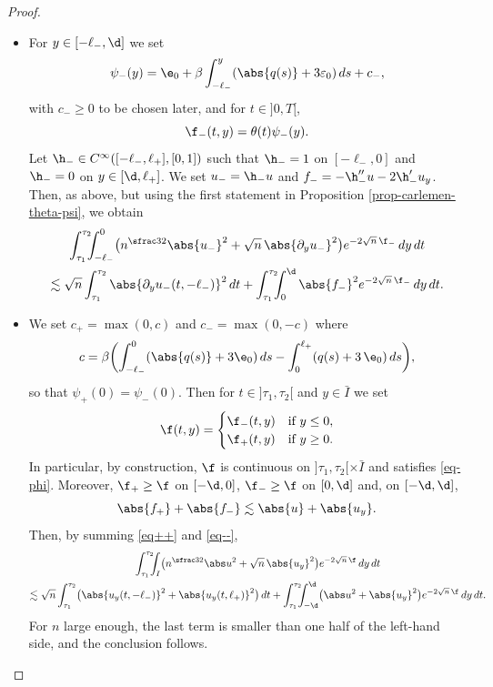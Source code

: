 \begin{proof}
\begin{itemize}
\item
For $y \in [-\ell_-,\d]$ we set
\[
\psi_-(y) = \e_0 + \beta \int_{-\ell_-}^y (\abs{q(s)} + 3 \varepsilon_0)\, ds + c_-,
\]
with $c_- \geq 0$ to be chosen later, and for $t \in{}]0,T[$,
\[
\f_-(t,y) = \theta(t) \psi_-(y).
\]
Let $\h_- \in C^\infty([-\ell_-,\ell_+],[0,1])$ such that $\h_- = 1$ on $[-\ell_-,0]$ and $\h_- = 0$ on $y \in [\d,\ell_+]$. We set $u_- = \h_- u$ and $f_- = -\h_-'' u - 2 \h_-' u_y$. Then, as above, but using the first statement in Proposition \ref{prop-carlemen-theta-psi}, we obtain
\begin{multline} \label{eq--}
\int_{\tau_1}^{\tau_2}\hspace*{-2mm} \int_{-\ell_-}^0 \bigl(n^{\sfrac 32} \abs {u_-}^2 + \sqrt n\,\abs{\partial_y u_-}^2 \bigr) e^{- 2 \sqrt n\,\f_-} \, dy \, dt\\
\lesssim \sqrt n \int_{\tau_1}^{\tau_2} \abs{\partial_y u_-(t,-\ell_-)}^2 \, dt + \int_{\tau_1}^{\tau_2}\hspace*{-2mm} \int_0^\d \abs {f_-}^2 e^{-2\sqrt n\,\f_-} \, dy \, dt.
\end{multline}

\item
We set $c_+ = \max(0,c)$ and $c_- = \max(0,-c)$ where
\[
c = \beta \biggl(\int_{-\ell_-}^0 (\abs{q(s)} + 3\e_0)\, ds - \int_0^{\ell_+}(q(s) + 3\, \e_0)\,ds \biggr),
\]
so that $\psi_+(0) = \psi_-(0)$. Then for $t \in{}]\tau_1,\tau_2[$ and $y \in \bar I$ we set
\[
\f(t,y) =
\begin{cases}
\f_-(t,y) & \text{if } y \leq 0,\\
\f_+(t,y) & \text{if } y \geq 0.
\end{cases}
\]
In particular, by construction, $\f$ is continuous on $]\tau_1,\tau_2[\times \bar I$ and satisfies \eqref{eq-phi}. Moreover, $\f_+ \geq \f$ on $[-\d,0]$, $\f_- \geq \f$ on $[0,\d]$ and, on $[-\d,\d]$,
\[
\abs{f_+} + \abs {f_-} \lesssim \abs {u} + \abs{u_y}.
\]
Then, by summing \eqref{eq++} and \eqref{eq--},
\begin{multline*}
\int_{\tau_1}^{\tau_2}\hspace*{-2mm} \int_{I} \bigl(n^{\sfrac 32} \abs u^2 + \sqrt n\,\abs{u_y}^2 \bigr) e^{-2 \sqrt n\,\f} \, dy \, dt\\
\lesssim \sqrt n \int_{\tau_1}^{\tau_2} \bigl(\abs{u_y(t,-\ell_-)}^2 + \abs{u_y(t,\ell_+)}^2 \bigr) \, dt + \int_{\tau_1}^{\tau_2}\hspace*{-2mm} \int_{-\d}^\d \bigl(\abs u^2 + \abs{u_y}^2\bigr) e^{-2\sqrt n\,\f} \, dy \, dt.
\end{multline*}
For $n$ large enough, the last term is smaller than one half of the left-hand side, and the conclusion follows.\qedhere
\end{itemize}
\end{proof}

